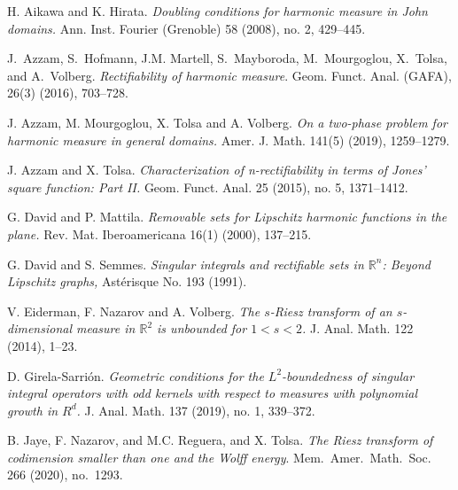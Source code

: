 \documentclass[11pt]{amsart}
\newcommand{\R}{{\mathbb R}}       %
\theoremstyle{definition}
\theoremstyle{remark}
\numberwithin{equation}{section}
\begin{document}
\begin{thebibliography}{NTWV}

H. Aikawa and K. Hirata. {\em Doubling conditions for harmonic measure in John domains.} Ann. Inst. Fourier (Grenoble) 58 (2008), no. 2, 429--445. 


J.~Azzam, S.~Hofmann, J.M. Martell, S.~Mayboroda, M.~Mourgoglou, X.~Tolsa, and
  A.~Volberg. \emph{Rectifiability of harmonic measure}. Geom. Funct. Anal. (GAFA), 26(3) (2016), 703--728. 
  

 J. Azzam, M. Mourgoglou, X. Tolsa and A. Volberg. {\em On a two-phase problem for harmonic measure in general domains.} 
Amer. J. Math. 141(5) (2019), 1259--1279.

 J. Azzam and X. Tolsa. {\em Characterization of n-rectifiability in terms of Jones' square function: Part II.} Geom. Funct. Anal. 25 (2015), no. 5, 1371--1412.

 G. David and P. Mattila. {\em Removable sets for Lipschitz
harmonic functions in the plane.} Rev. Mat. Iberoamericana 16(1) (2000),
137--215.

 G. David and S. Semmes. {\em Singular integrals and
rectifiable sets in $\R^n$: Beyond Lipschitz graphs,} Ast\'{e}risque
No. 193 (1991).


 V. Eiderman, F. Nazarov and A. Volberg. {\em The $s$-Riesz transform of an 
$s$-dimensional measure in $\R^2$ is unbounded for $1<s<2$.} 
J. Anal. Math. 122 (2014), 1--23. 

 D. Girela-Sarri\'on. {\em Geometric conditions for the $L^2$-boundedness of singular integral operators with odd kernels with respect to measures with polynomial growth in $R^d$.}  J. Anal. Math. 137 (2019), no. 1, 339--372. 

 B. Jaye, F. Nazarov, and M.C. Reguera, and X. Tolsa. {\em The Riesz transform of codimension smaller than one and the Wolff energy}.  Mem.\ Amer.\ Math.\ Soc.  266 (2020), no.\ 1293.


\end{thebibliography}
\end{document}
